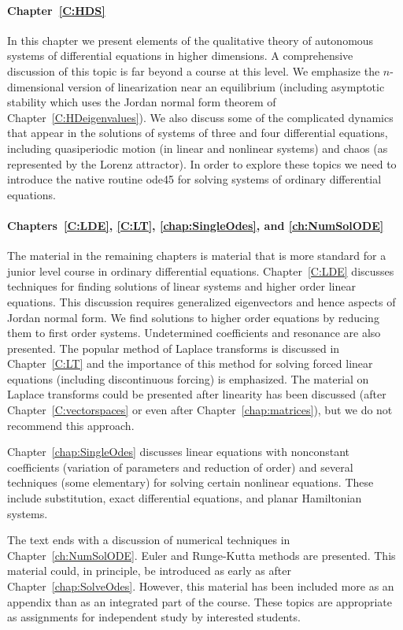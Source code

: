 \paragraph{Chapter~\ref{C:HDS}}  In this chapter we present elements of the
qualitative theory of autonomous systems of differential equations in higher
dimensions.  A comprehensive discussion of this topic is far beyond a course 
at this level.  We emphasize the $n$-dimensional version of linearization near
an equilibrium (including asymptotic stability which uses the Jordan normal 
form theorem of Chapter~\ref{C:HDeigenvalues}).  We also discuss some of the 
complicated dynamics that appear in the solutions of systems of three and 
four differential equations, including quasiperiodic motion (in linear and 
nonlinear systems) and chaos (as represented by the Lorenz attractor).  In 
order to explore these topics we need to introduce the \Matlab native routine 
{\sf ode45} for solving systems of ordinary differential equations.

\paragraph{Chapters~\ref{C:LDE}, \ref{C:LT}, \ref{chap:SingleOdes}, and 
\ref{ch:NumSolODE}}  The material in the remaining chapters is material that 
is more standard for a junior level course in ordinary differential equations.
Chapter~\ref{C:LDE} discusses techniques for finding solutions of linear 
systems and higher order linear equations.  This discussion requires 
generalized eigenvectors and hence aspects of Jordan normal form.  We find 
solutions to higher order equations by reducing them to first order systems.  
Undetermined coefficients and resonance are also presented.  The popular 
method of Laplace transforms 
is discussed in Chapter~\ref{C:LT} and the importance of this method for
solving forced linear equations (including discontinuous forcing) is
emphasized.  The material on Laplace transforms could be presented after
linearity has been discussed (after Chapter~\ref{C:vectorspaces} or even 
after Chapter~\ref{chap:matrices}), but we do not recommend this approach.

Chapter~\ref{chap:SingleOdes} discusses linear equations with nonconstant
coefficients (variation of parameters and reduction of order) and several
techniques (some elementary) for solving certain nonlinear equations.  These
include substitution, exact differential equations, and planar Hamiltonian
systems.

The text ends with a discussion of numerical techniques in 
Chapter~\ref{ch:NumSolODE}.  Euler and Runge-Kutta methods are presented. 
This material could, in principle, be introduced as early as after
Chapter~\ref{chap:SolveOdes}.   However, this material has been included more
as an appendix than as an integrated part of the course.  These topics are
appropriate as assignments for independent study by interested students.

